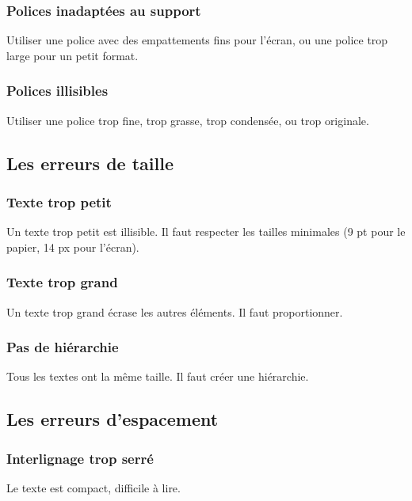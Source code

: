 \subsubsection{Polices inadaptées au support}

Utiliser une police avec des empattements fins pour l'écran, ou une police trop large pour un petit format.

\subsubsection{Polices illisibles}

Utiliser une police trop fine, trop grasse, trop condensée, ou trop originale.

\subsection{Les erreurs de taille}

\subsubsection{Texte trop petit}

Un texte trop petit est illisible. Il faut respecter les tailles minimales (9 pt pour le papier, 14 px pour l'écran).

\subsubsection{Texte trop grand}

Un texte trop grand écrase les autres éléments. Il faut proportionner.

\subsubsection{Pas de hiérarchie}

Tous les textes ont la même taille. Il faut créer une hiérarchie.

\subsection{Les erreurs d'espacement}

\subsubsection{Interlignage trop serré}

Le texte est compact, difficile à lire.

